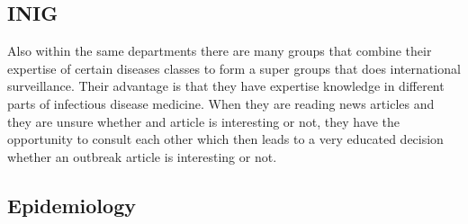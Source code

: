 \subsection{INIG}
Also within the same departments there are many groups that combine their
expertise of certain diseases classes to form a super groups that does international
surveillance. Their advantage is that they have expertise knowledge in different
parts of infectious disease medicine. When they are reading news articles and they
are unsure whether and article is interesting or not, they have the opportunity
to consult each other which then leads to a very educated decision whether an
outbreak article is interesting or not.

\subsection{Epidemiology}
\cite{WHOepi}

